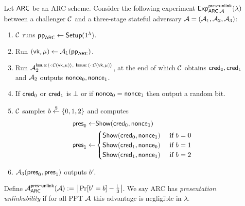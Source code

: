 \begin{definition}\label{def:pres-unlink}
Let $\mathsf{ARC}$ be an ARC scheme. Consider the following experiment
$\mathsf{Exp}^{\mathsf{pres\mbox{-}unlink}}_{\mathsf{ARC},\mathcal{A}}(\lambda)$ between a challenger $\mathcal{C}$ and a three-stage stateful adversary $\mathcal{A}=(\mathcal{A}_1,\mathcal{A}_2,\mathcal{A}_3)$:
\begin{enumerate}[leftmargin=1.25em]
  \item $\mathcal{C}$ runs $\mathsf{pp}_{\mathsf{ARC}}\gets \mathsf{Setup}(1^\lambda)$.
  \item Run $(\mathsf{vk},\mu)\gets \mathcal{A}_1(\mathsf{pp}_{\mathsf{ARC}})$.
  \item Run $\mathcal{A}_2^{\mathsf{Issue}:\langle \cdot: \mathcal{C}(\mathsf{vk},\mu)\rangle ,~ \mathsf{Issue}:\langle \cdot: \mathcal{C}(\mathsf{vk},\mu)\rangle }$, at the end of which $\mathcal{C}$ obtains $\mathsf{cred}_0,\mathsf{cred}_1$ and $\mathcal{A}_2$ outputs $\mathsf{nonce}_0,\mathsf{nonce}_1$.
  \item If $\mathsf{cred}_0$ or $\mathsf{cred}_1$ is $\bot$ or if $\mathsf{nonce}_0=\mathsf{nonce}_1$ then output a random bit.

  \item $\mathcal{C}$ samples $b\overset{\$}{\leftarrow}\{0,1,2\}$ and computes
  \begin{align*}
    \mathsf{pres}_0 \leftarrow & \mathsf{Show}(\mathsf{cred}_0,\mathsf{nonce}_0) \\
    \mathsf{pres}_1 \leftarrow & \begin{cases}\mathsf{Show}(\mathsf{cred}_0,\mathsf{nonce}_1) & \text{ if } b=0\\
    \mathsf{Show}(\mathsf{cred}_1,\mathsf{nonce}_0) & \text{ if } b=1\\
    \mathsf{Show}(\mathsf{cred}_1,\mathsf{nonce}_1) & \text{ if } b=2
    \end{cases}
  \end{align*}
  \item $\mathcal{A}_3(\mathsf{pres}_0,\mathsf{pres}_1)$ outputs $b'$.
\end{enumerate}
Define $\mathcal{A}^{\mathsf{pres\mbox{-}unlink}}_{\mathsf{ARC}}(\mathcal{A}) := \big| \Pr[b'=b]-\tfrac13 \big|$.
We say ARC has \emph{presentation unlinkability} if for all PPT $\mathcal{A}$ this advantage is negligible in $\lambda$.

\end{definition}



